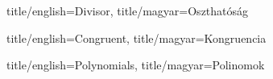 \begin{Section}{
  title/english=Divisor,
  title/magyar=Oszthatóság}

  

\end{Section}

\begin{Section}{
  title/english=Congruent,
  title/magyar=Kongruencia}

  

\end{Section}

\begin{Section}{
  title/english=Polynomials,
  title/magyar=Polinomok}

  

\end{Section}
